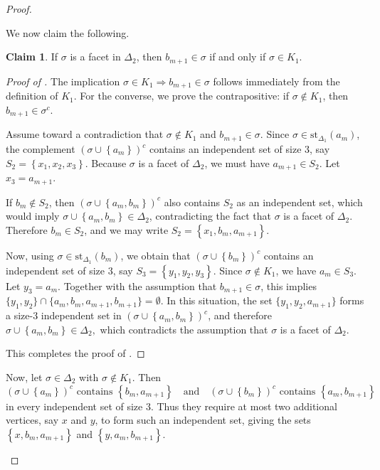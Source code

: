 \documentclass[11pt,reqno,a4paper]{amsart}
\theoremstyle{definition}
\theoremstyle{theorem}
\newtheorem{claim}{Claim}[theorem]
\newcommand{\lno}{\left(}
\newcommand{\rno}{\right)}
\newcommand{\lcu}{\left\{}
\newcommand{\rcu}{\right\}}
\newcommand{\st}{\mathrm{st}}
\theoremstyle{remark}
\begin{document}
\begin{proof}
\begin{enumerate}
\begin{enumerate}[label = \Alph*.]
    We now claim the following.

    \begin{claim}\label{claim: b_(m+1) in sigma iff sigma in K1}
    If $\sigma$ is a facet in $\Delta_2$, then $b_{m+1} \in \sigma$ if and only if $\sigma \in K_1$.
\end{claim}

\begin{proof}[Proof of ]
    The implication $\sigma \in K_1 \Rightarrow b_{m+1} \in \sigma$ follows immediately from the definition of $K_1$. For the converse, we prove the contrapositive: if $\sigma \notin K_1$, then $b_{m+1} \in \sigma^c$.

    Assume toward a contradiction that $\sigma \notin K_1$ and $b_{m+1} \in \sigma$. Since $\sigma \in \st_{\Delta_1}\lno a_m \rno$, the complement $\lno \sigma \cup \lcu a_m \rcu \rno^c$ contains an independent set of size $3$, say $S_2 = \lcu x_1, x_2, x_3 \rcu$. Because $\sigma$ is a facet of $\Delta_2$, we must have $a_{m+1} \in S_2$. Let $x_3 = a_{m+1}$.

    If $b_m \notin S_2$, then $\lno \sigma \cup \lcu a_m, b_m \rcu \rno^c$ also contains $S_2$ as an independent set, which would imply $\sigma \cup \lcu a_m, b_m \rcu \in \Delta_2$, contradicting the fact that $\sigma$ is a facet of $\Delta_2$. Therefore $b_m \in S_2$, and we may write $ S_2 = \lcu x_1, b_m, a_{m+1} \rcu.$

    Now, using $\sigma \in \st_{\Delta_1}\lno b_m \rno$, we obtain that $\lno \sigma \cup \lcu b_m \rcu \rno^c$ contains an independent set of size $3$, say $S_3 = \lcu y_1, y_2, y_3 \rcu$. Since $\sigma \notin K_1$, we have $a_m \in S_3$. Let $y_3 = a_m$. Together with the assumption that $b_{m+1} \in \sigma$, this implies
    $\{y_1, y_2\} \cap \{a_m, b_m, a_{m+1}, b_{m+1}\} = \emptyset.$    
    In this situation, the set $\{y_1, y_2, a_{m+1}\}$ forms a size-$3$ independent set in $\lno \sigma \cup \lcu a_m, b_m \rcu \rno^c$, and therefore
    $ \sigma \cup \lcu a_m, b_m \rcu \in \Delta_2,$
    which contradicts the assumption that $\sigma$ is a facet of $\Delta_2$.
    
    This completes the proof of .
    \end{proof}

    Now, let $\sigma \in \Delta_2$ with $\sigma \notin K_1$. Then 
    \[
        \lno \sigma \cup \lcu a_m \rcu \rno^c \text{ contains } \lcu b_m, a_{m+1} \rcu
        \quad\text{and}\quad
        \lno \sigma \cup \lcu b_m \rcu \rno^c \text{ contains } \lcu a_m, b_{m+1} \rcu
    \]
    in every independent set of size $3$. Thus they require at most two additional vertices, say $x$ and $y$, to form such an independent set, giving the sets $\lcu x, b_m, a_{m+1} \rcu$ and $\lcu y, a_m, b_{m+1} \rcu$.
    

\end{enumerate}
\end{enumerate}
\end{proof}
\end{document}
